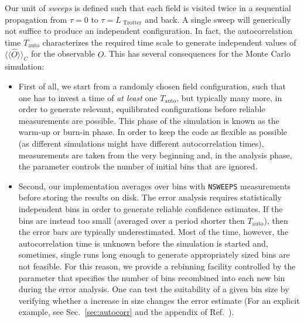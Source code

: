 Our unit of \textit{sweeps} is defined such that each field is visited twice in a sequential propagation from $\tau = 0$ to $\tau = L_{\text{ Trotter}}$ and back. A single sweep will  generically not suffice to produce an independent configuration.
In fact, the autocorrelation time $T_\mathrm{auto}$ characterizes the required time scale to generate independent values of $\langle\langle\hat{O}\rangle\rangle_C$ for the observable $O$. This has several consequences for the Monte Carlo simulation:
\begin{itemize}
	\item First of all, we start from a randomly chosen field configuration, such that one has to invest a time of \emph{at least} one $T_\mathrm{auto}$, but typically many more, in order to generate relevant, equilibrated configurations before reliable measurements are possible. This phase of the simulation is known as the warm-up or burn-in phase. In order to keep the code as flexible as possible (as different simulations might have different autocorrelation times), measurements are taken from the very beginning and, in the analysis phase, the parameter  controls the number of initial bins that are ignored.
	\item Second, our implementation averages over bins with \texttt{NSWEEPS} measurements before storing the results on disk. The  error analysis requires statistically  independent bins in order to generate reliable confidence estimates. If the bins are instead too small (averaged over a period shorter then $T_\mathrm{auto}$), then the error bars are typically underestimated. Most of the time, however, the autocorrelation time is unknown before the simulation is started and, sometimes, single runs long enough to generate appropriately sized bins are not feasible. For this reason, we provide a rebinning facility controlled by the parameter  that specifies the number of bins recombined into each new bin during the error analysis. One can test the suitability of a given bin size by verifying whether a increase in size changes the error estimate (For an explicit example, see Sec.~\ref{sec:autocorr} and the appendix of Ref.~\cite{Assaad02}).


\end{itemize}
